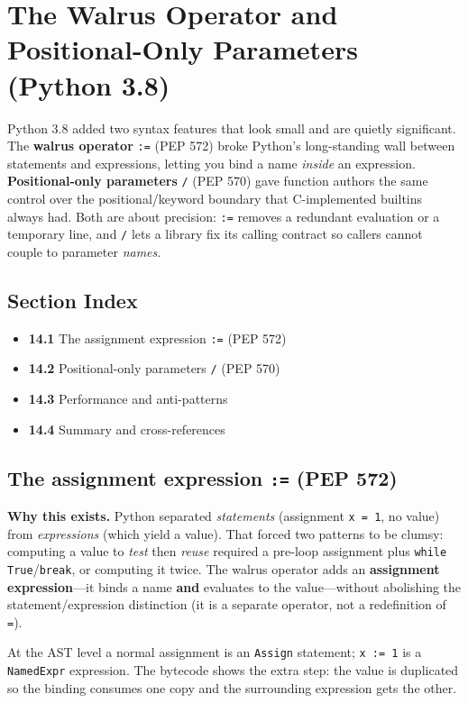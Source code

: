 \chapter{The Walrus Operator and Positional-Only Parameters (Python 3.8)}

Python 3.8 added two syntax features that look small and are quietly significant. The \textbf{walrus
operator} \texttt{:=} (PEP 572) broke Python's long-standing wall between statements and
expressions, letting you bind a name \emph{inside} an expression. \textbf{Positional-only
parameters} \texttt{/} (PEP 570) gave function authors the same control over the positional/keyword
boundary that C-implemented builtins always had. Both are about precision: \texttt{:=} removes a
redundant evaluation or a temporary line, and \texttt{/} lets a library fix its calling contract so
callers cannot couple to parameter \emph{names}.

\section*{Section Index}
\begin{itemize}
  \item \textbf{14.1} The assignment expression \texttt{:=} (PEP 572)
  \item \textbf{14.2} Positional-only parameters \texttt{/} (PEP 570)
  \item \textbf{14.3} Performance and anti-patterns
  \item \textbf{14.4} Summary and cross-references
\end{itemize}

\section{The assignment expression \texttt{:=} (PEP 572)}

\textbf{Why this exists.} Python separated \emph{statements} (assignment \texttt{x = 1}, no value)
from \emph{expressions} (which yield a value). That forced two patterns to be clumsy: computing a
value to \emph{test} then \emph{reuse} required a pre-loop assignment plus \texttt{while
True}/\texttt{break}, or computing it twice. The walrus operator adds an \textbf{assignment
expression}---it binds a name \textbf{and} evaluates to the value---without abolishing the
statement/expression distinction (it is a separate operator, not a redefinition of \texttt{=}).

At the AST level a normal assignment is an \texttt{Assign} statement; \texttt{x := 1} is a
\texttt{NamedExpr} expression. The bytecode shows the extra step: the value is duplicated so the
binding consumes one copy and the surrounding expression gets the other.

